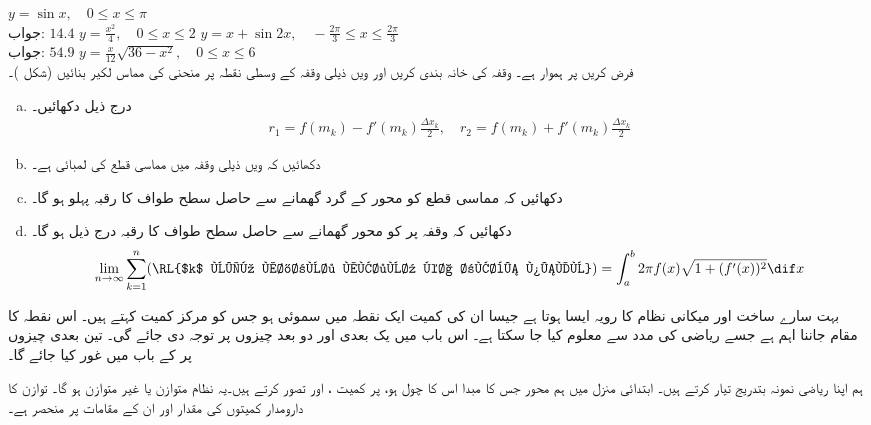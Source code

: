 $y=\sin x,\quad 0\le x\le \pi$\\
جواب:\quad
$14.4$
$y=\tfrac{x^2}{4},\quad 0\le x\le 2$
$y=x+\sin 2x,\quad -\tfrac{2\pi}{3}\le x\le \tfrac{2\pi}{3}$\\
جواب:\quad
$54.9$
$y=\tfrac{x}{12}\sqrt{36-x^2},\quad 0\le x\le 6$
\\
فرض کریں  پر  ہموار ہے۔ وقفہ  کی خانہ بندی کریں اور  ویں ذیلی وقفہ  کے وسطی نقطہ  پر منحنی کی مماس لکیر بنائیں (شکل )۔
\begin{enumerate}[a.]
\item
درج ذیل دکھائیں۔
\begin{align*}
r_1=f(m_k)-f'(m_k)\frac{\Delta x_k}{2},\quad r_2=f(m_k)+f'(m_k)\frac{\Delta x_k}{2}
\end{align*}
\item
دکھائیں کہ  ویں ذیلی وقفہ میں مماسی قطع کی لمبائی  ہے۔
\item
دکھائیں کہ مماسی قطع کو محور  کے گرد گھمانے سے حاصل سطح طواف کا رقبہ پہلو  ہو گا۔
\item
دکھائیں کہ وقفہ  پر  کو محور  گھمانے سے حاصل سطح طواف کا رقبہ درج ذیل ہو گا۔
\begin{align*}
\lim_{n\to \infty}\sum_{k=1}^n(\text{\RL{$k$ ویں مخروط مقطوع کا رقبہ پہلو}})=\int_a^b2\pi f(x)\sqrt{1+(f'(x))^2}\dif x
\end{align*}
\end{enumerate}

بہت سارے ساخت اور میکانی نظام کا رویہ ایسا ہوتا ہے جیسا ان کی کمیت ایک نقطہ میں سموئی   ہو جس کو مرکز کمیت کہتے ہیں۔ اس نقطہ کا مقام جاننا اہم ہے جسے ریاضی کی مدد سے معلوم کیا جا سکتا ہے۔ اس باب میں یک بعدی اور دو بعد چیزوں پر توجہ دی جائے گی۔ تین بعدی چیزوں پر  کے باب  میں غور کیا جائے گا۔

ہم اپنا ریاضی نمونہ بتدریج تیار کرتے ہیں۔ ابتدائی منزل میں ہم  محور  جس کا مبدا اس کا چول ہو، پر کمیت ،  اور  تصور کرتے ہیں۔یہ نظام متوازن یا غیر متوازن ہو گا۔ توازن کا دارومدار کمیتوں کی مقدار اور ان کے مقامات پر منحصر ہے۔ 

